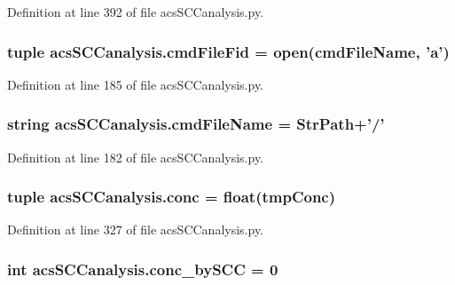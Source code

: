 Definition at line 392 of file acs\-S\-C\-Canalysis.\-py.

\hypertarget{a00102_a0a501feb02e67bd6a8ba75490709cf89}{
\subsubsection[{cmd\-File\-Fid}]{\setlength{\rightskip}{0pt plus 5cm}tuple acs\-S\-C\-Canalysis.\-cmd\-File\-Fid = open({\bf cmd\-File\-Name}, '{\bf a}')}}\label{a00102_a0a501feb02e67bd6a8ba75490709cf89}


Definition at line 185 of file acs\-S\-C\-Canalysis.\-py.

\hypertarget{a00102_a32551f85ad3cd8080b8ad81828276368}{
\subsubsection[{cmd\-File\-Name}]{\setlength{\rightskip}{0pt plus 5cm}string acs\-S\-C\-Canalysis.\-cmd\-File\-Name = {\bf Str\-Path}+'/'}}\label{a00102_a32551f85ad3cd8080b8ad81828276368}


Definition at line 182 of file acs\-S\-C\-Canalysis.\-py.

\hypertarget{a00102_a6ec435b19c74f79f32a0eae7bb2bd1c8}{
\subsubsection[{conc}]{\setlength{\rightskip}{0pt plus 5cm}tuple acs\-S\-C\-Canalysis.\-conc = float(tmp\-Conc)}}\label{a00102_a6ec435b19c74f79f32a0eae7bb2bd1c8}


Definition at line 327 of file acs\-S\-C\-Canalysis.\-py.

\hypertarget{a00102_aac2f508d526d62bd7f9d4f5a5f8b1821}{
\subsubsection[{conc\-\_\-by\-S\-C\-C}]{\setlength{\rightskip}{0pt plus 5cm}int acs\-S\-C\-Canalysis.\-conc\-\_\-by\-S\-C\-C = 0}}\label{a00102_aac2f508d526d62bd7f9d4f5a5f8b1821}


